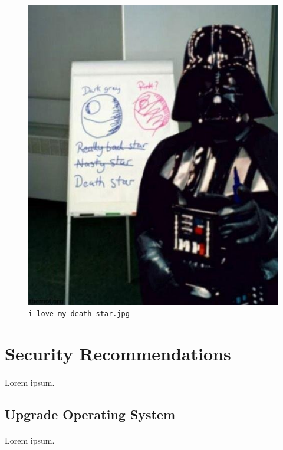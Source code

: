 \documentclass{article}
\begin{document}
\begin{figure}[H]
	\includegraphics[width=\linewidth]{resources/plans/i-love-my-death-star.jpg}
	\caption{\texttt{i-love-my-death-star.jpg}}
	\label{fig:i-love-my-death-star}
\end{figure}

\newpage

\section{Security Recommendations}
\paragraph{}
Lorem ipsum.

\subsection{Upgrade Operating System}
\paragraph{}
Lorem ipsum.
\end{document}
